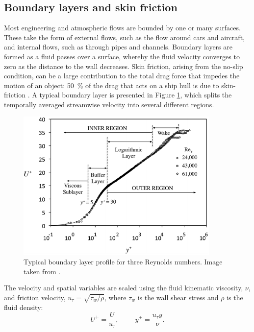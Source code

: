 \documentclass[12pt,oneside,a4paper]{article}
\begin{document}
\subsection{Boundary layers and skin friction}
Most engineering and atmospheric flows are bounded by one or many surfaces. These take the form of external flows, such as the flow around cars and aircraft, and internal flows, such as through pipes and channels. Boundary layers are formed as a fluid passes over a surface, whereby the fluid velocity converges to zero as the distance to the wall decreases. Skin friction, arising from the no-slip condition, can be a large contribution to the total drag force that impedes the motion of an object: \SI{50}{\%} of the drag that acts on a ship hull is due to skin-friction \citep{perlin2016}. A typical boundary layer is presented in Figure \ref{figure:literatureReview:boundaryLayerRegions}, which splits the temporally averaged streamwise velocity into several different regions.
%
\begin{figure}[!b]
\centering
\includegraphics[width=10cm]{images/litReview/boundaryLayerRegions.png}
\caption{Typical boundary layer profile for three Reynolds numbers. Image taken from \cite{perlin2016}. }
\label{figure:literatureReview:boundaryLayerRegions}
\end{figure}
%
The velocity and spatial variables are scaled using the fluid kinematic viscosity, $\nu$, and friction velocity, $u_\tau = \sqrt{\tau_w / \rho}$, where $\tau_w$ is the wall shear stress and $\rho$ is the fluid density:
\begin{equation}
\label{equation:litReview:UplusYplus}
U^+ = \frac{U}{u_\tau}, \hspace{1cm} y^+ = \frac{u_\tau y }{\nu}.
\end{equation}
\end{document}
